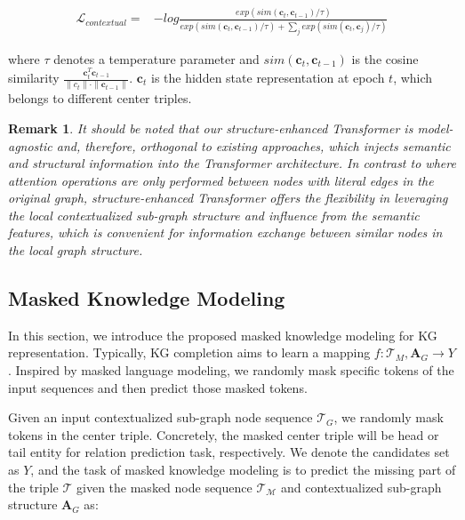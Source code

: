 \documentclass[sigconf]{acmart}
\newtheorem{remark}{\noindent \textbf{Remark}}
\begin{document}
\begin{small}
\begin{equation}
\begin{aligned}
  \mathcal{L}_{contextual} =  & - log \frac{exp(sim(\boldsymbol{c}_{t}, \boldsymbol{c}_{t-1})/\tau )}{exp(sim(\boldsymbol{c}_t,\boldsymbol{c}_{t-1})/\tau) + \sum_{j}{ exp(sim(\boldsymbol{c}_t, \boldsymbol{c}_{j}) /\tau )}}
\end{aligned}
\end{equation}
\end{small}

where $\tau$ denotes a temperature parameter and $sim(\boldsymbol{c}_t, \boldsymbol{c}_{t-1})$ is the cosine similarity $\frac{{\boldsymbol{c}}_t^{{T}}{\boldsymbol{c}}_{t-1}}{\|{c}_t\| \cdot \|{\boldsymbol{c}}_{t-1} \|}$.
$\boldsymbol{c}_t$ is the hidden state representation at epoch $t$, which belongs to different center triples.

\begin{remark}
It should be noted that our structure-enhanced Transformer is model-agnostic and, therefore, orthogonal to existing approaches, which injects semantic and structural information into the Transformer architecture.
In contrast to \cite{transformers} where attention operations are only performed between nodes with literal edges in the original graph, structure-enhanced Transformer offers the flexibility in leveraging the local contextualized sub-graph structure and influence from the semantic features, which is convenient for information exchange between similar nodes in the local graph structure. 
\end{remark}

\subsection{Masked Knowledge Modeling}
\label{sec:MKM}
In this section, we introduce the proposed masked knowledge modeling for KG representation.
Typically, KG completion aims to learn a mapping $f:\mathcal{T}_M, \mathbf{A}_G \to Y$.
Inspired by masked language modeling, we randomly mask specific tokens of the input sequences and then predict those masked tokens.

Given an input contextualized sub-graph node sequence $\mathcal{T}_G$, we randomly mask tokens in the center triple.
Concretely, the masked center triple will be head or tail entity for relation prediction task, respectively.
We denote the candidates set as $Y$, and the task of masked knowledge modeling is to predict the missing part of the triple $\mathcal{T}$ given the masked node sequence $\mathcal{T_{M}}$ and contextualized sub-graph structure $\mathbf{A}_{G}$ as:
\end{document}
